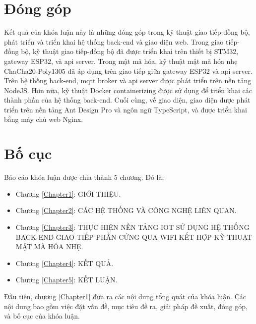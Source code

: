 \section{Đóng góp}

Kết quả của khóa luận này là những đóng góp trong kỹ thuật giao tiếp-đồng bộ, phát triển và triển khai hệ thống back-end và giao diện web. Trong giao tiếp-đồng bộ, kỹ thuật giao tiếp-đồng bộ đã được triển khai trên thiết bị STM32, gateway ESP32, và \acrshort{api} server. Trong mật mã hóa, kỹ thuật mật mã hóa nhẹ ChaCha20-Poly1305 đã áp dụng trên giao tiếp giữa gateway ESP32 và \acrshort{api} server. Trên hệ thống back-end, \acrshort{mqtt} broker và \acrshort{api} server được phát triển trên nền tảng NodeJS. Hơn nữa, kỹ thuật Docker containerizing được sử dụng để triển khai các thành phần của hệ thống back-end. Cuối cùng, về giao diện, giao diện được phát triển trên nền tảng Ant Design Pro và ngôn ngữ TypeScript, và được triển khai bằng máy chủ web Nginx.

\section{Bố cục}

Báo cáo khóa luận được chia thành 5 chương. Đó là:
\begin{itemize}
    \item Chương \ref{Chapter1}: GIỚI THIỆU.
    \item Chương \ref{Chapter2}: CÁC HỆ THỐNG VÀ CÔNG NGHỆ LIÊN QUAN.
    \item Chương \ref{Chapter3}: THỰC HIỆN NỀN TẢNG IOT SỬ DỤNG HỆ THỐNG BACK-END GIAO TIẾP PHẦN CỨNG QUA WIFI KẾT HỢP KỸ THUẬT MẬT MÃ HÓA NHẸ.
    \item Chương \ref{Chapter4}: KẾT QUẢ.
    \item Chương \ref{Chapter5}: KẾT LUẬN.
\end{itemize}

Đầu tiên, chương \ref{Chapter1} đưa ra các nội dung tổng quát của khóa luận. Các nội dung bao gồm việc đặt vấn đề, mục tiêu đề ra, giải pháp đề xuất, đóng góp, và bố cục của khóa luận.

